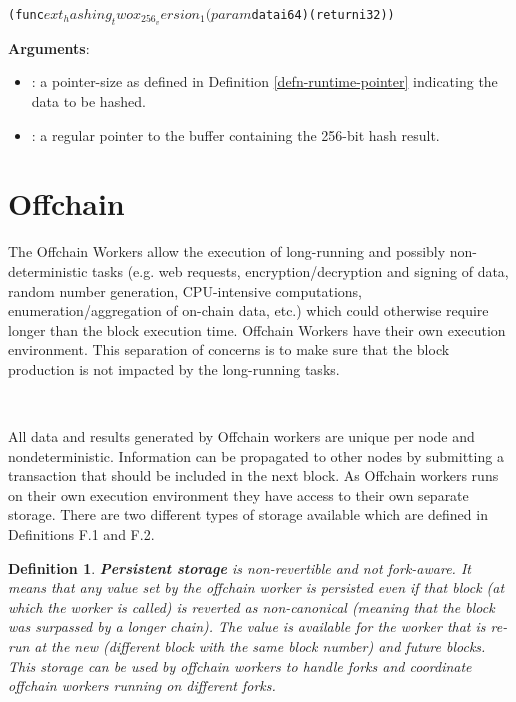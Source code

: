 \documentclass{book}
\newcommand{\tmstrong}[1]{\textbf{#1}}
\newcommand{\tmtextbf}[1]{{\bfseries{#1}}}
\newcommand{\tmtexttt}[1]{{\ttfamily{#1}}}
\newcommand{\tmverbatim}[1]{{\ttfamily{#1}}}
\newtheorem{definition}{Definition}
\providecommand{\tmstrong}[1]{\tmtextbf{#1}}
\providecommand{\tmtextbf}[1]{\tmtextbf{#1}}
\providecommand{\tmverbatim}[1]{\tmtexttt{#1}}
\newtheorem{definition}{Definition}
\begin{document}
\begin{alltt}
(func $ext_hashing_twox_256_version_1
  (param $data i64) (return i32))
\end{alltt}


{\tmstrong{Arguments}}:
\begin{itemize}
  \item {\tmstrong{}}\tmverbatim{data}: a pointer-size as defined in
  Definition \ref{defn-runtime-pointer} indicating the data to be hashed.
  
  \item \tmverbatim{return}: a regular pointer to the buffer containing the
  256-bit hash result.
\end{itemize}

\section{Offchain}

The Offchain Workers allow the execution of long-running and possibly
non-deterministic tasks (e.g. web requests, encryption/decryption and signing
of data, random number generation, CPU-intensive computations,
enumeration/aggregation of on-chain data, etc.) which could otherwise require
longer than the block execution time. Offchain Workers have their own
execution environment. This separation of concerns is to make sure that the
block production is not impacted by the long-running tasks.

\

All data and results generated by Offchain workers are unique per node and
nondeterministic. Information can be propagated to other nodes by submitting a
transaction that should be included in the next block. As Offchain workers
runs on their own execution environment they have access to their own separate
storage. There are two different types of storage available which are defined
in Definitions F.1 and F.2.

\begin{definition}
  \label{defn-persistent-storage}{\tmstrong{Persistent storage}} is
  non-revertible and not fork-aware. It means that any value set by the
  offchain worker is persisted even if that block (at which the worker is
  called) is reverted as non-canonical (meaning that the block was surpassed
  by a longer chain). The value is available for the worker that is re-run at
  the new (different block with the same block number) and future blocks. This
  storage can be used by offchain workers to handle forks and coordinate
  offchain workers running on different forks.
\end{definition}
\end{document}
